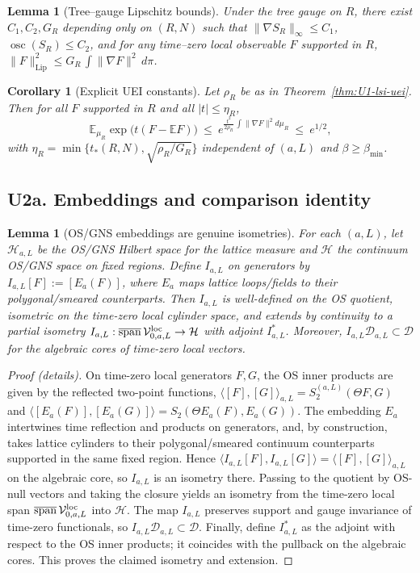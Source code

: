 \documentclass[11pt]{amsart}
\theoremstyle{plain}
\newtheorem{lemma}[theorem]{Lemma}
\newtheorem{corollary}[theorem]{Corollary}
\theoremstyle{definition}
\theoremstyle{remark}
\renewcommand{\tfrac}[2]{\textstyle\frac{#1}{#2}}
\begin{document}
\begin{lemma}[Tree–gauge Lipschitz bounds]\label{lem:U1-tree-bounds}
Under the tree gauge on $R$, there exist $C_1,C_2,G_R$ depending only on $(R,N)$ such that $\|\nabla S_R\|_{\infty}\le C_1$, $\operatorname{osc}(S_R)\le C_2$, and for any time--zero local observable $F$ supported in $R$, $\|F\|_{\mathrm{Lip}}^2\le G_R\,\int\|\nabla F\|^2\,d\pi$.
\end{lemma}
\begin{corollary}[Explicit UEI constants]\label{cor:U1-uei}
Let $\rho_R$ be as in Theorem~\ref{thm:U1-lsi-uei}. Then for all $F$ supported in $R$ and all $|t|\le \eta_R$,
\[
  \mathbb E_{\mu_R}\exp\big(t(F-\mathbb E F)\big)\ \le\ e^{\tfrac{t^2}{2\rho_R}\,\int\|\nabla F\|^2 d\mu_R}\ \le\ e^{1/2},
\]
with $\eta_R=\min\{t_*(R,N),\sqrt{\rho_R/G_R}\}$ independent of $(a,L)$ and $\beta\ge \beta_{\min}$.
\end{corollary}
\subsection*{U2a. Embeddings and comparison identity}
\begin{lemma}[OS/GNS embeddings are genuine isometries]\label{lem:U2-embeddings}
For each $(a,L)$, let $\mathcal H_{a,L}$ be the OS/GNS Hilbert space for the lattice measure and $\mathcal H$ the continuum OS/GNS space on fixed regions. Define $I_{a,L}$ on generators by $I_{a,L}[F]:=[E_a(F)]$, where $E_a$ maps lattice loops/fields to their polygonal/smeared counterparts. Then $I_{a,L}$ is well-defined on the OS quotient, isometric on the time-zero local cylinder space, and extends by continuity to a partial isometry $I_{a,L}:\overline{\mathrm{span}}\,\mathcal V^{\rm loc}_{0,a,L}\to\mathcal H$ with adjoint $I_{a,L}^*$. Moreover, $I_{a,L}\mathcal D_{a,L}\subset\mathcal D$ for the algebraic cores of time-zero local vectors.
\end{lemma}

\begin{proof}[Proof (details)]
On time-zero local generators $F,G$, the OS inner products are given by the reflected two-point functions, $\langle [F],[G]\rangle_{a,L}=S^{(a,L)}_2(\Theta F,G)$ and $\langle [E_a(F)],[E_a(G)]\rangle=S_2(\Theta E_a(F),E_a(G))$. The embedding $E_a$ intertwines time reflection and products on generators, and, by construction, takes lattice cylinders to their polygonal/smeared continuum counterparts supported in the same fixed region. Hence $\langle I_{a,L}[F], I_{a,L}[G]\rangle=\langle [F],[G]\rangle_{a,L}$ on the algebraic core, so $I_{a,L}$ is an isometry there. Passing to the quotient by OS-null vectors and taking the closure yields an isometry from the time-zero local span $\overline{\mathrm{span}}\,\mathcal V^{\rm loc}_{0,a,L}$ into $\mathcal H$. The map $I_{a,L}$ preserves support and gauge invariance of time-zero functionals, so $I_{a,L}\mathcal D_{a,L}\subset\mathcal D$. Finally, define $I_{a,L}^*$ as the adjoint with respect to the OS inner products; it coincides with the pullback on the algebraic cores. This proves the claimed isometry and extension.
\end{proof}
\end{document}
